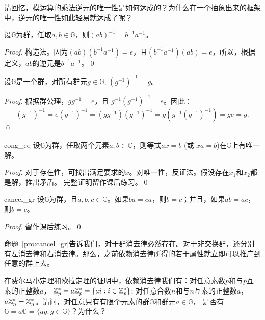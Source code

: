 \begin{thinking}
	请回忆，模运算的乘法逆元的唯一性是如何达成的？为什么在一个抽象出来的框架中，逆元的唯一性如此轻易就达成了呢？
\end{thinking}

\begin{proposition}{}{}
		设$\mathbb{G}$为群，任取$a, b \in \mathbb{G}$，则$(ab)^{-1} = b^{-1} a^{-1}$。
\end{proposition}

	\begin{proof}
		构造法。因为$(ab)(b^{-1}a^{-1}) = e$，且$(b^{-1}a^{-1}) (ab) = e$，所以，根据定义，$ab$的逆元是$b^{-1}a^{-1}$。\qed
	\end{proof}

	\begin{proposition}{}{}
		设$\mathbb{G}$是一个群，对所有群元$ g \in \mathbb{G}$, $(g^{-1})^{-1} = g$。
	\end{proposition}

	\begin{proof}
	根据群公理，$g g^{-1}=e$，且 $g^{-1}(g^{-1})^{-1} = e$。因此：
		\[
		(g^{-1})^{-1} = e(g^{-1})^{-1} =  (g g^{-1}) (g^{-1})^{-1} = g( g^{-1} (g^{-1})^{-1})= ge = g .
		\]
		\qed
	\end{proof}

\begin{proposition}{}{cong_eq}
	设$\mathbb{G}$为群，任取两个元素$a, b \in \mathbb{G}$，则等式$ax = b$ (或 $xa = b $)在$\mathbb{G}$上有唯一解。
\end{proposition}
		
	\begin{proof}对于存在性，可找出满足要求的$x$。对唯一性，反证法。假设存在$x_1$和$x_2$都是解，推出矛盾。
	完整证明留作课后练习。\qed
	\end{proof}

\begin{proposition}{}{cancel_gr}
	设$\mathbb{G}$为群，且$a, b, c \in \mathbb{G}$。如果$ba = ca$，则$b = c$；并且，如果$ab = ac$，则$b = c$。
\end{proposition}
	\begin{proof}
		 留作课后练习。\qed
	\end{proof}
命题~\ref{pro:cancel_gr}告诉我们，对于群消去律必然存在。对于非交换群，还分别有左消去律和右消去律。那么，之前依赖消去律所得的若干属性就立即可以推广到任意的群上去。

\begin{example}
在费尔马小定理和欧拉定理的证明中，依赖消去律我们有：对任意素数$p$和与$p$互素的正整数$a$，
${\mathbb Z}_p^* =a {\mathbb Z}_p^* = \{ a i : i \in {\mathbb Z}_p^* \}$; 
对任意合数$n$和与$n$互素的正整数$a$，$a {\mathbb Z}_n^* = {\mathbb Z}_n^*$。请问，对任意只有有限个元素的群$\mathbb{G}$和群元$a\in \mathbb{G}$，
是否有$ \mathbb{G} = a \mathbb{G} = \{a g :  g \in \mathbb{G} \} $？为什么？
\end{example}


